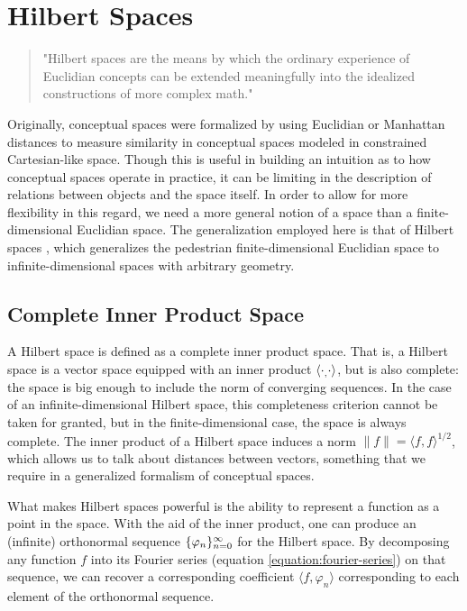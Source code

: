 \section{Hilbert Spaces}
\label{section:hilbert-spaces}

\begin{quote}
  "Hilbert spaces are the means by which the ordinary experience of Euclidian concepts can be extended meaningfully into the idealized constructions of more complex math." \citep{bernkopf2008schmidt}
\end{quote}

Originally, conceptual spaces \citep{gardenfors2004conceptual} were formalized by using Euclidian or Manhattan distances to measure similarity in conceptual spaces modeled in constrained Cartesian-like space. Though this is useful in building an intuition as to how conceptual spaces operate in practice, it can be limiting in the description of relations between objects and the space itself.  In order to allow for more flexibility in this regard, we need a more general notion of a space than a finite-dimensional Euclidian space.  The generalization employed here is that of Hilbert spaces \citep{kennedy2013hilbert}, which generalizes the pedestrian finite-dimensional Euclidian space to infinite-dimensional spaces with arbitrary geometry.

\subsection{Complete Inner Product Space} 
\label{subsection:complete-inner-product-space}

A Hilbert space is defined as a complete inner product space.  That is, a Hilbert space is a vector space equipped with an inner product $\langle\cdot _, \cdot\rangle$, but is also complete: the space is big enough to include the norm of converging sequences.  In the case of an infinite-dimensional Hilbert space, this completeness criterion cannot be taken for granted, but in the finite-dimensional case, the space is always complete.  The inner product of a Hilbert space induces a norm $\|f\| = \langle f, f \rangle^{1/2}$, which allows us to talk about distances between vectors, something that we require in a generalized formalism of conceptual spaces.

What makes Hilbert spaces powerful is the ability to represent a function as a point in the space.  With the aid of the inner product, one can produce an (infinite) orthonormal sequence $\{ \varphi_n \}_{n=0}^\infty$ for the Hilbert space.  By decomposing any function $f$ into its Fourier series (equation \ref{equation:fourier-series}) on that sequence, we can recover a corresponding coefficient $\langle f, \varphi_n \rangle$ corresponding to each element of the orthonormal sequence.

